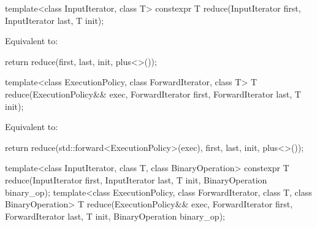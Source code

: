 %
\begin{itemdecl}
template<class InputIterator, class T>
  constexpr T reduce(InputIterator first, InputIterator last, T init);
\end{itemdecl}

\begin{itemdescr}
\pnum
\effects
Equivalent to:
\begin{codeblock}
return reduce(first, last, init, plus<>());
\end{codeblock}
\end{itemdescr}

%
\begin{itemdecl}
template<class ExecutionPolicy, class ForwardIterator, class T>
  T reduce(ExecutionPolicy&& exec,
           ForwardIterator first, ForwardIterator last, T init);
\end{itemdecl}

\begin{itemdescr}
\pnum
\effects
Equivalent to:
\begin{codeblock}
return reduce(std::forward<ExecutionPolicy>(exec), first, last, init, plus<>());
\end{codeblock}
\end{itemdescr}


%
\begin{itemdecl}
template<class InputIterator, class T, class BinaryOperation>
  constexpr T reduce(InputIterator first, InputIterator last, T init,
                     BinaryOperation binary_op);
template<class ExecutionPolicy, class ForwardIterator, class T, class BinaryOperation>
  T reduce(ExecutionPolicy&& exec,
           ForwardIterator first, ForwardIterator last, T init,
           BinaryOperation binary_op);
\end{itemdecl}

